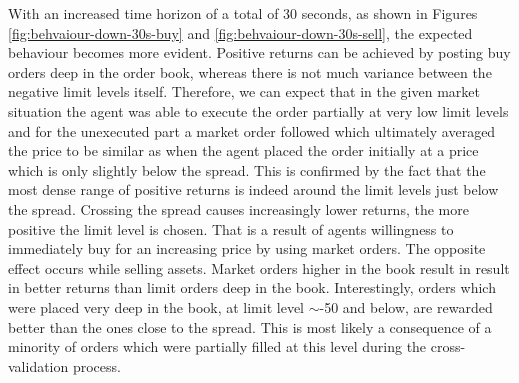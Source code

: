 With an increased time horizon of a total of 30 seconds, as shown in Figures \ref{fig:behvaiour-down-30s-buy} and \ref{fig:behvaiour-down-30s-sell}, the expected behaviour becomes more evident.
Positive returns can be achieved by posting buy orders deep in the order book, whereas there is not much variance between the negative limit levels itself.
Therefore, we can expect that in the given market situation the agent was able to execute the order partially at very low limit levels and for the unexecuted part a market order followed which ultimately averaged the price to be similar as when the agent placed the order initially at a price which is only slightly below the spread.
This is confirmed by the fact that the most dense range of positive returns is indeed around the limit levels just below the spread.
Crossing the spread causes increasingly lower returns, the more positive the limit level is chosen.
That is a result of agents willingness to immediately buy for an increasing price by using market orders.
The opposite effect occurs while selling assets.
Market orders higher in the book result in result in better returns than limit orders deep in the book.
Interestingly, orders which were placed very deep in the book, at limit level $\sim$-50 and below, are rewarded better than the ones close to the spread.
This is most likely a consequence of a minority of orders which were partially filled at this level during the cross-validation process.

